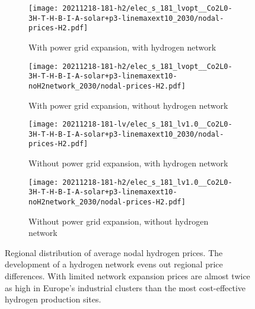 \begin{figure}
    \begin{subfigure}{0.49\textwidth}
        \centering
        \caption{With power grid expansion, with hydrogen network}
        \texttt{[image: 20211218-181-h2/elec\_s\_181\_lvopt\_\_Co2L0-3H-T-H-B-I-A-solar+p3-linemaxext10\_2030/nodal-prices-H2.pdf]}
    \end{subfigure}
    \begin{subfigure}{0.49\textwidth}
        \centering
        \caption{With power grid expansion, without hydrogen network}
        \texttt{[image: 20211218-181-h2/elec\_s\_181\_lvopt\_\_Co2L0-3H-T-H-B-I-A-solar+p3-linemaxext10-noH2network\_2030/nodal-prices-H2.pdf]}
    \end{subfigure}
    \begin{subfigure}{0.49\textwidth}
        \centering
        \caption{Without power grid expansion, with hydrogen network}
        \texttt{[image: 20211218-181-lv/elec\_s\_181\_lv1.0\_\_Co2L0-3H-T-H-B-I-A-solar+p3-linemaxext10\_2030/nodal-prices-H2.pdf]}
    \end{subfigure}
    \begin{subfigure}{0.49\textwidth}
        \centering
        \caption{Without power grid expansion, without hydrogen network}
        \texttt{[image: 20211218-181-h2/elec\_s\_181\_lv1.0\_\_Co2L0-3H-T-H-B-I-A-solar+p3-linemaxext10-noH2network\_2030/nodal-prices-H2.pdf]}
    \end{subfigure}
    \caption{Regional distribution of average nodal hydrogen prices. The
    development of a hydrogen network evens out regional price differences. With
    limited  network expansion prices are almost twice as high in
    Europe's industrial clusters than the most cost-effective hydrogen
    production sites.}
    \label{fig:si:lmp-h2}
\end{figure}

